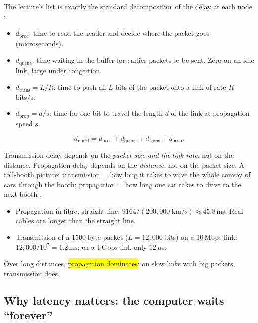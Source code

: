 The lecture's list is exactly the standard decomposition of the delay at each node :

\begin{defn}
\begin{itemize}
  \item {} $d_{\text{proc}}$: time to read the header and decide where the packet goes (microseconds).
  \item {} $d_{\text{queue}}$: time waiting in the buffer for earlier packets to be sent. Zero on an idle link, large under congestion.
  \item {} $d_{\text{trans}} = L/R$: time to push all $L$ bits of the packet onto a link of rate $R$ bits/s.
  \item {} $d_{\text{prop}} = d/s$: time for one bit to travel the length $d$ of the link at propagation speed $s$.
\end{itemize}
\[ d_{\text{nodal}} = d_{\text{proc}} + d_{\text{queue}} + d_{\text{trans}} + d_{\text{prop}}. \]
\end{defn}

\begin{pitfall}
Transmission delay depends on the \emph{packet size and the link rate}, not on the distance. Propagation delay depends on the \emph{distance},
not on the packet size. A toll-booth picture: transmission = how long it takes to wave the whole convoy of cars through the booth;
propagation = how long one car takes to drive to the next booth .
\end{pitfall}

\begin{example}
\begin{itemize}
  \item Propagation in fibre, straight line: $9164/(200{,}000\text{ km/s}) \approx 45.8$\,ms. Real cables are longer than the straight line.
  \item Transmission of a 1500-byte packet ($L=12{,}000$ bits) on a 10\,Mbps link: $12{,}000/10^7 = 1.2$\,ms; on a 1\,Gbps link only $12\,\mu$s.
\end{itemize}
Over long distances, \hl{propagation dominates}; on slow links with big packets, transmission does.
\end{example}

\subsection{Why latency matters: the computer waits ``forever''}

